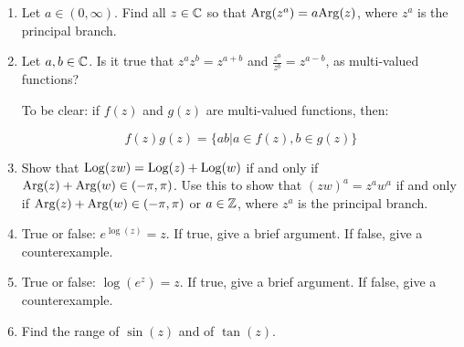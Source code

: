 \begin{enumerate}
\item Let $a \in (0,\infty)$. Find all $z \in \mathbb{C}$ so that $\mathrm{Arg}(z^a) = a\mathrm{Arg}(z)$, where $z^a$ is the principal branch.

\item Let $a,b \in \mathbb{C}$. Is it true that $z^az^b = z^{a+b}$ and $\frac{z^a}{z^b} = z^{a-b}$, as multi-valued functions?

To be clear: if $f(z)$ and $g(z)$ are multi-valued functions, then:

$$f(z)g(z) = \{ab|a\in f(z), b\in g(z)\}$$

\item Show that $\mathrm{Log}(zw) = \mathrm{Log}(z) + \mathrm{Log}(w)$ if and only if $\mathrm{Arg}(z) + \mathrm{Arg}(w) \in (-\pi,\pi)$. Use this to show that $(zw)^a = z^aw^a$ if and only if $\mathrm{Arg}(z) + \mathrm{Arg}(w) \in (-\pi,\pi)$ or $a\in \mathbb{Z}$, where $z^a$ is the principal branch.

\item True or false: $e^{\log(z)} = z$. If true, give a brief argument. If false, give a counterexample.

\item True or false: $\log(e^z) = z$. If true, give a brief argument. If false, give a counterexample.

\item Find the range of $\sin(z)$ and of $\tan(z)$.



\end{enumerate}